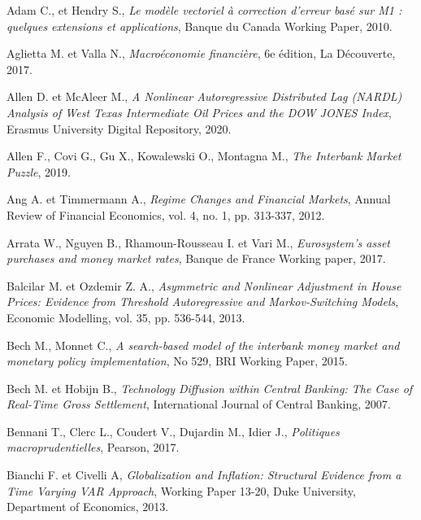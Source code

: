 \begin{thebibliography}{MMM99}

Adam C., et Hendry S., 
\textit{Le modèle vectoriel à correction d'erreur basé sur M1 : quelques extensions et applications},
Banque du Canada Working Paper, 2010.

Aglietta M. et Valla N., 
\textit{Macroéconomie financière}, 6e édition,
La Découverte, 2017.

Allen D. et McAleer M., 
\textit{A Nonlinear Autoregressive Distributed Lag (NARDL) Analysis of West Texas Intermediate Oil Prices and the DOW JONES Index}, Erasmus University Digital Repository,
2020.

Allen F., Covi G., Gu X., Kowalewski O., Montagna M.,
\textit{The Interbank Market Puzzle}, 
2019.

Ang A. et Timmermann A., 
\textit{Regime Changes and Financial Markets}, Annual Review of Financial Economics, vol. 4, no. 1, pp. 313-337, 2012.

Arrata W., Nguyen B., Rhamoun-Rousseau I. et Vari M.,
\textit{Eurosystem's asset purchases and money market rates}, 
Banque de France Working paper, 2017.

Balcilar M. et Ozdemir Z. A., 
\textit{Asymmetric and Nonlinear Adjustment in House Prices: Evidence from Threshold Autoregressive and Markov-Switching Models}, 
Economic Modelling, vol. 35, pp. 536-544, 2013.

Bech M., Monnet C., 
\textit{A search-based model of the interbank money market and monetary policy implementation}, No 529, BRI Working Paper, 2015.

Bech M. et Hobijn B.,
\textit{Technology Diffusion within Central Banking: The Case of Real-Time Gross Settlement},
International Journal of Central Banking, 2007.

Bennani T., Clerc L., Coudert V., Dujardin M., Idier J.,
\textit{Politiques macroprudentielles},
Pearson, 2017.

Bianchi F. et Civelli A, 
\textit{Globalization and Inflation: Structural Evidence from a Time Varying VAR Approach}, 
Working Paper 13-20, Duke University, Department of Economics, 2013.


\end{thebibliography}
